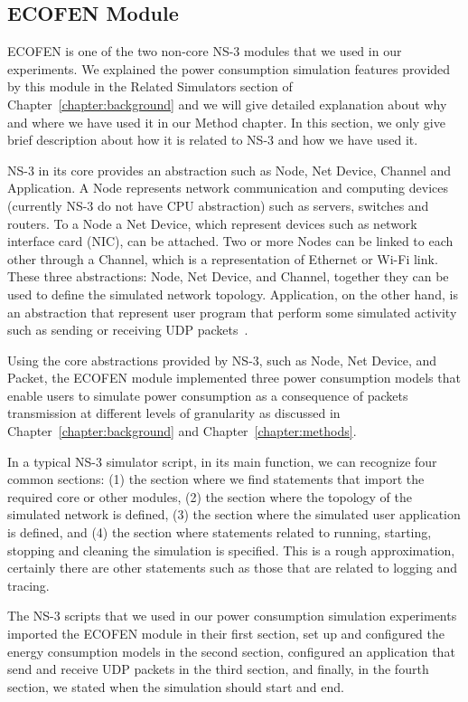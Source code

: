 \subsection{ECOFEN Module}
ECOFEN is one of the two non-core NS-3 modules that we used in our experiments. We explained the power consumption simulation features provided by this module in the Related Simulators section of Chapter~\ref{chapter:background} and we will give detailed explanation about why and where we have used it in our Method chapter. In this section, we only give brief description about how it is related to NS-3 and how we have used it. 

NS-3 in its core provides an abstraction such as Node, Net Device, Channel and Application. A Node represents  network communication and computing devices (currently NS-3 do not have CPU abstraction) such as servers, switches and routers. To a Node a Net Device, which represent devices such as network interface card (NIC), can be attached. Two or more Nodes can be linked to each other through a Channel, which is a representation of Ethernet or Wi-Fi link. These three abstractions: Node, Net Device, and Channel, together they can be used to define the simulated network topology. Application, on the other hand, is an abstraction that represent user program that perform some simulated activity such as sending or receiving UDP packets~\cite{ns3}. 

Using the core abstractions provided by NS-3, such as  Node, Net Device, and Packet, the ECOFEN module implemented three power consumption models that enable users to simulate power consumption as a consequence of packets transmission at different levels of granularity as discussed in Chapter~\ref{chapter:background} and Chapter~\ref{chapter:methods}.

In a typical NS-3 simulator script, in its main function, we can recognize four common sections: (1) the section where we find statements that import the required core or other modules, (2) the section where the topology of the simulated network is defined, (3) the section where the simulated user application is defined, and (4) the section where statements related to running, starting, stopping and cleaning the simulation is specified. This is a rough approximation, certainly there are other statements such as those that are related to logging and tracing. 

The NS-3 scripts that we used in our power consumption simulation experiments imported the ECOFEN module in their first section, set up and configured the energy consumption models in the second section, configured an application that send and receive UDP packets in the third section, and finally, in the fourth section, we stated when the simulation should start and end. 

